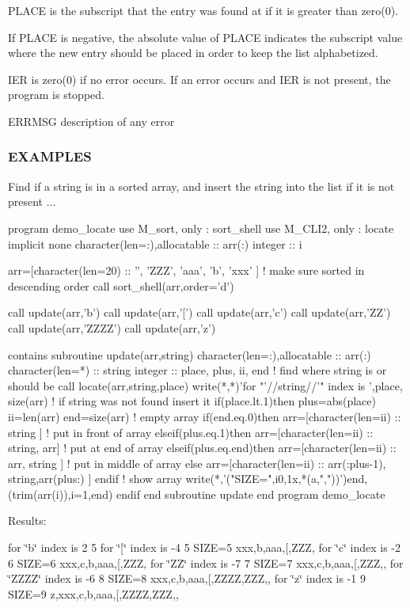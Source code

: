 P\+L\+A\+CE is the subscript that the entry was found at if it is greater than zero(0).

If P\+L\+A\+CE is negative, the absolute value of P\+L\+A\+CE indicates the subscript value where the new entry should be placed in order to keep the list alphabetized.

I\+ER is zero(0) if no error occurs. If an error occurs and I\+ER is not present, the program is stopped.

E\+R\+R\+M\+SG description of any error

\subsubsection*{E\+X\+A\+M\+P\+L\+ES}

Find if a string is in a sorted array, and insert the string into the list if it is not present ... \begin{DoxyVerb}program demo_locate
use M_sort, only : sort_shell
use M_CLI2, only : locate
implicit none
character(len=:),allocatable  :: arr(:)
integer                       :: i

arr=[character(len=20) :: '', 'ZZZ', 'aaa', 'b', 'xxx' ]
! make sure sorted in descending order
call sort_shell(arr,order='d')

call update(arr,'b')
call update(arr,'[')
call update(arr,'c')
call update(arr,'ZZ')
call update(arr,'ZZZZ')
call update(arr,'z')

contains
subroutine update(arr,string)
character(len=:),allocatable :: arr(:)
character(len=*)             :: string
integer                      :: place, plus, ii, end
! find where string is or should be
call locate(arr,string,place)
write(*,*)'for "'//string//'" index is ',place, size(arr)
! if string was not found insert it
if(place.lt.1)then
   plus=abs(place)
   ii=len(arr)
   end=size(arr)
   ! empty array
   if(end.eq.0)then
      arr=[character(len=ii) :: string ]
   ! put in front of array
   elseif(plus.eq.1)then
      arr=[character(len=ii) :: string, arr]
   ! put at end of array
   elseif(plus.eq.end)then
      arr=[character(len=ii) :: arr, string ]
   ! put in middle of array
   else
      arr=[character(len=ii) :: arr(:plus-1), string,arr(plus:) ]
   endif
   ! show array
   write(*,'("SIZE=",i0,1x,*(a,","))')end,(trim(arr(i)),i=1,end)
endif
end subroutine update
end program demo_locate
\end{DoxyVerb}


Results\+:

for \char`\"{}b\char`\"{} index is 2 5 for \char`\"{}\mbox{[}\char`\"{} index is -\/4 5 S\+I\+ZE=5 xxx,b,aaa,\mbox{[},Z\+ZZ, for \char`\"{}c\char`\"{} index is -\/2 6 S\+I\+ZE=6 xxx,c,b,aaa,\mbox{[},Z\+ZZ, for \char`\"{}\+Z\+Z\char`\"{} index is -\/7 7 S\+I\+ZE=7 xxx,c,b,aaa,\mbox{[},Z\+ZZ,, for \char`\"{}\+Z\+Z\+Z\+Z\char`\"{} index is -\/6 8 S\+I\+ZE=8 xxx,c,b,aaa,\mbox{[},Z\+Z\+ZZ,Z\+ZZ,, for \char`\"{}z\char`\"{} index is -\/1 9 S\+I\+ZE=9 z,xxx,c,b,aaa,\mbox{[},Z\+Z\+ZZ,Z\+ZZ,,

